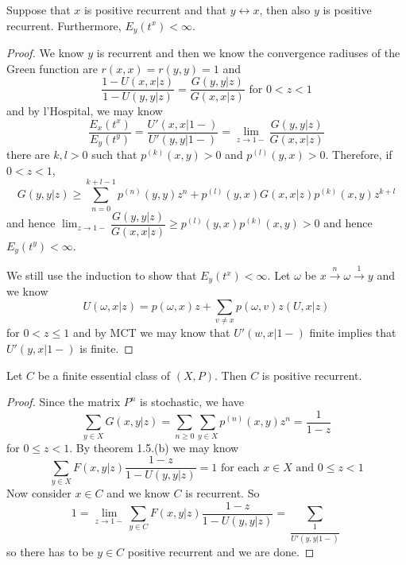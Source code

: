 \documentclass[lang=en, color=blue, ]{elegantbook}
\begin{document}
\begin{theorem}
    Suppose that $x$ is positive recurrent and that $y\leftrightarrow x$, then also $y$ is positive recurrent. Furthermore, $E_y(t^x) < \infty$.
\end{theorem}
\begin{proof}
    We know $y$ is recurrent and then we know the convergence radiuses of the Green function are $r(x,x) = r(y,y) = 1$ and
    \[
    \dfrac{1-U(x,x|z)}{1-U(y,y|z)} = \dfrac{G(y,y|z)}{G(x,x|z)}\text{ for }0<z<1
    \]
    and by l'Hospital, we may know
    \[
    \dfrac{E_x(t^x)}{E_y(t^y)} = \dfrac{U'(x,x|1-)}{U'(y,y|1-)} = \lim_{z\to 1-}\dfrac{G(y,y|z)}{G(x,x|z)}
    \]
    there are $k,l > 0$ such that $p^{(k)}(x,y) > 0$ and $p^{(l)}(y,x) > 0$. Therefore, if $0<z<1$,
    \[G(y,y|z) \geq \sum\limits_{n=0}^{k+l-1}p^{(n)}(y,y)z^n + p^{(l)}(y,x)G(x,x|z)p^{(k)}(x,y)z^{k+l}\]
    and hence $\lim_{z\to 1-}\dfrac{G(y,y|z)}{G(x,x|z)} \geq p^{(l)}(y,x)p^{(k)}(x,y) > 0$ and hence $E_y(t^y) < \infty$.\par
    We still use the induction to show that $E_y(t^x) < \infty$. Let $\omega$ be $x\overset{n}{\rightarrow}\omega\overset{1}{\rightarrow}y$ and we know
    \[
    U(\omega,x|z) = p(\omega,x)z+\sum\limits_{v\neq x}p(\omega,v)z(U,x|z)
    \]
    for $0<z\leq 1$ and by MCT we may know that $U'(w,x|1-)$ finite implies that $U'(y,x|1-)$ is finite.
\end{proof}

\begin{theorem}
    Let $C$ be a finite essential class of $(X,P)$. Then $C$ is positive recurrent.
\end{theorem}
\begin{proof}
    Since the matrix $P^n$ is stochastic, we have
    \[
    \sum\limits_{y\in X}G(x,y|z) = \sum_{n\geq 0}\sum\limits_{y\in X}p^{(n)}(x,y)z^n = \dfrac{1}{1-z}
    \]
    for $0\leq z < 1$. By theorem 1.5.(b) we may know
    \[
    \sum\limits_{y\in X}F(x,y|z)\dfrac{1-z}{1-U(y,y|z)} = 1\text{ for each }x\in X\text{ and }0\leq z <1
    \]
    Now consider $x\in C$ and we know $C$ is recurrent. So
    \[
    1 = \lim_{z\to 1-}\sum\limits_{y\in C}F(x,y|z)\dfrac{1-z}{1-U(y,y|z)} = \sum\limits_{\dfrac{1}{U'(y,y|1-)}}
    \]
    so there has to be $y\in C$ positive recurrent and we are done.
\end{proof}
\end{document}
